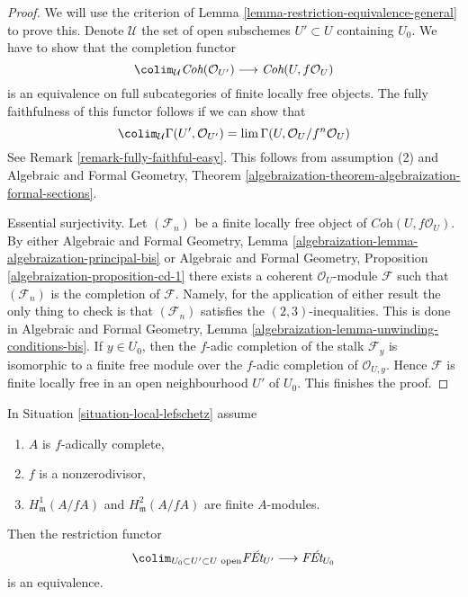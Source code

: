 \begin{proof}
We will use the criterion of Lemma \ref{lemma-restriction-equivalence-general}
to prove this. Denote $\mathcal{U}$ the set of open subschemes $U' \subset U$
containing $U_0$. We have to show that the completion functor
$$
\colim_\mathcal{U} \textit{Coh}(\mathcal{O}_{U'})
\longrightarrow
\textit{Coh}(U, f\mathcal{O}_U)
$$
is an equivalence on full subcategories of finite locally free objects.
The fully faithfulness of this functor follows if we can show
that
$$
\colim_\mathcal{U}
\Gamma(U', \mathcal{O}_{U'}) =
\lim \Gamma(U, \mathcal{O}_U/f^n\mathcal{O}_U)
$$
See Remark \ref{remark-fully-faithful-easy}. This follows from
assumption (2) and Algebraic and Formal Geometry, Theorem
\ref{algebraization-theorem-algebraization-formal-sections}.

\medskip\noindent
Essential surjectivity. Let $(\mathcal{F}_n)$ be a finite locally
free object of $\textit{Coh}(U, f\mathcal{O}_U)$. By either
Algebraic and Formal Geometry, Lemma
\ref{algebraization-lemma-algebraization-principal-bis}
or
Algebraic and Formal Geometry, Proposition
\ref{algebraization-proposition-cd-1}
there exists a coherent $\mathcal{O}_U$-module $\mathcal{F}$
such that $(\mathcal{F}_n)$ is the completion of $\mathcal{F}$.
Namely, for the application of either result the only thing to
check is that $(\mathcal{F}_n)$ satisfies the $(2, 3)$-inequalities.
This is done in Algebraic and Formal Geometry, Lemma
\ref{algebraization-lemma-unwinding-conditions-bis}. If $y \in U_0$,
then the $f$-adic completion of the stalk $\mathcal{F}_y$ is isomorphic to
a finite free module over the $f$-adic completion of $\mathcal{O}_{U, y}$.
Hence $\mathcal{F}$ is finite locally free in an open neighbourhood
$U'$ of $U_0$. This finishes the proof.
\end{proof}

\begin{lemma}
\label{lemma-essentially-surjective-general}
In Situation \ref{situation-local-lefschetz} assume
\begin{enumerate}
\item $A$ is $f$-adically complete,
\item $f$ is a nonzerodivisor,
\item $H^1_\mathfrak m(A/fA)$ and $H^2_\mathfrak m(A/fA)$
are finite $A$-modules.
\end{enumerate}
Then the restriction functor
$$
\colim_{U_0 \subset U' \subset U\text{ open}} \textit{F\'Et}_{U'}
\longrightarrow
\textit{F\'Et}_{U_0}
$$
is an equivalence.
\end{lemma}

